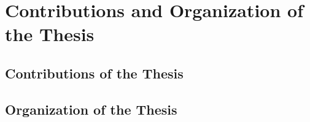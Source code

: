 \section{Contributions and Organization of the Thesis}

\subsection{Contributions  of the Thesis}

\subsection{Organization of the Thesis}
